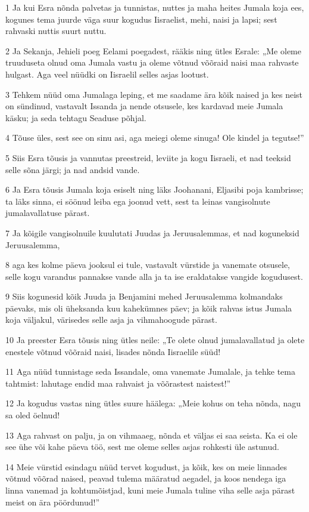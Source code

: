 \par 1 Ja kui Esra nõnda palvetas ja tunnistas, nuttes ja maha heites Jumala koja ees, kogunes tema juurde väga suur kogudus Iisraelist, mehi, naisi ja lapsi; sest rahvaski nuttis suurt nuttu.
\par 2 Ja Sekanja, Jehieli poeg Eelami poegadest, rääkis ning ütles Esrale: „Me oleme truuduseta olnud oma Jumala vastu ja oleme võtnud võõraid naisi maa rahvaste hulgast. Aga veel nüüdki on Iisraelil selles asjas lootust.
\par 3 Tehkem nüüd oma Jumalaga leping, et me saadame ära kõik naised ja kes neist on sündinud, vastavalt Issanda ja nende otsusele, kes kardavad meie Jumala käsku; ja seda tehtagu Seaduse põhjal.
\par 4 Tõuse üles, sest see on sinu asi, aga meiegi oleme sinuga! Ole kindel ja tegutse!”
\par 5 Siis Esra tõusis ja vannutas preestreid, leviite ja kogu Iisraeli, et nad teeksid selle sõna järgi; ja nad andsid vande.
\par 6 Ja Esra tõusis Jumala koja esiselt ning läks Joohanani, Eljasibi poja kambrisse; ta läks sinna, ei söönud leiba ega joonud vett, sest ta leinas vangisolnute jumalavallatuse pärast.
\par 7 Ja kõigile vangisolnuile kuulutati Juudas ja Jeruusalemmas, et nad koguneksid Jeruusalemma,
\par 8 aga kes kolme päeva jooksul ei tule, vastavalt vürstide ja vanemate otsusele, selle kogu varandus pannakse vande alla ja ta ise eraldatakse vangide kogudusest.
\par 9 Siis kogunesid kõik Juuda ja Benjamini mehed Jeruusalemma kolmandaks päevaks, mis oli üheksanda kuu kahekümnes päev; ja kõik rahvas istus Jumala koja väljakul, värisedes selle asja ja vihmahoogude pärast.
\par 10 Ja preester Esra tõusis ning ütles neile: „Te olete olnud jumalavallatud ja olete enestele võtnud võõraid naisi, lisades nõnda Iisraelile süüd!
\par 11 Aga nüüd tunnistage seda Issandale, oma vanemate Jumalale, ja tehke tema tahtmist: lahutage endid maa rahvaist ja võõrastest naistest!”
\par 12 Ja kogudus vastas ning ütles suure häälega: „Meie kohus on teha nõnda, nagu sa oled öelnud!
\par 13 Aga rahvast on palju, ja on vihmaaeg, nõnda et väljas ei saa seista. Ka ei ole see ühe või kahe päeva töö, sest me oleme selles asjas rohkesti üle astunud.
\par 14 Meie vürstid esindagu nüüd tervet kogudust, ja kõik, kes on meie linnades võtnud võõrad naised, peavad tulema määratud aegadel, ja koos nendega iga linna vanemad ja kohtumõistjad, kuni meie Jumala tuline viha selle asja pärast meist on ära pöördunud!”
